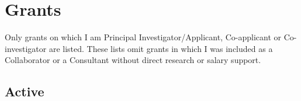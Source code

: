 \documentclass[11pt]{moderncv}
\begin{document}
\begin{refsection}
\nocite{*}
\printbibliography[heading=bibliography,title=Conference publications]
\end{refsection}




\section{Grants}

Only grants on which I am Principal Investigator/Applicant, Co-applicant or Co-investigator are listed.
These lists omit grants in which I was included as a Collaborator or a Consultant without direct research or salary support.



%




\subsection {Active}
\end{document}
